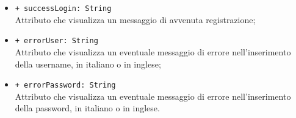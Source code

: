 \begin{itemize}
\begin{itemize}
		\item \texttt{+ successLogin: String} \\ Attributo che visualizza un messaggio di avvenuta registrazione;
		\item \texttt{+ errorUser: String} \\ Attributo che visualizza un eventuale messaggio di errore nell'inserimento della username, in italiano o in inglese;
		\item \texttt{+ errorPassword: String} \\ Attributo che visualizza un eventuale messaggio di errore nell'inserimento della password, in italiano o in inglese.
	\end{itemize}
\end{itemize}